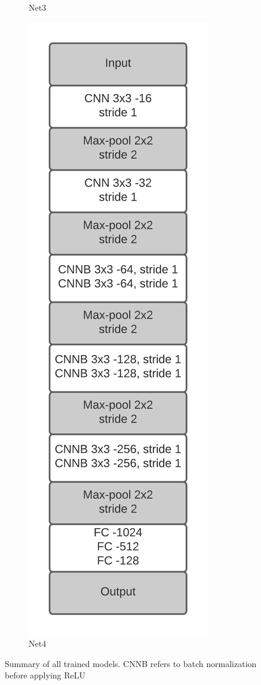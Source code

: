 \documentclass{article}
\begin{document}
\begin{figure}[h!]
\begin{subfigure}[t]{.23\textwidth}
	\caption{Net3}		
	\end{subfigure}
	\begin{subfigure}[t]{.23\textwidth}
		\centering
		\includegraphics[scale=0.66]{../code/images/Net4_layers.png}
		\caption{Net4}		
		\end{subfigure}
	\caption{Summary of all trained models. CNNB refers to batch normalization before applying ReLU}
	\label{fig:models}
\end{figure}
\clearpage
\end{document}
